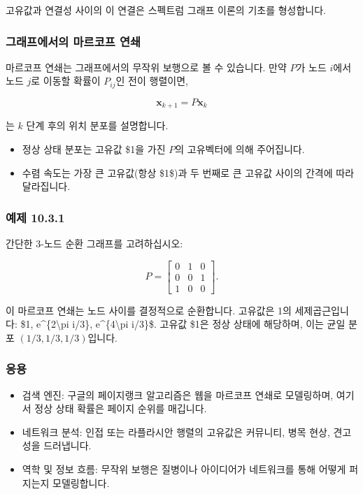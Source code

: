 \documentclass[
  12pt,
  a4paper,
]{article}
\begin{document}
고유값과 연결성 사이의 이 연결은 스펙트럼 그래프 이론의 기초를 형성합니다.

\subsubsection{그래프에서의 마르코프 연쇄}\label{markov-chains-on-graphs}

마르코프 연쇄는 그래프에서의 무작위 보행으로 볼 수 있습니다. 만약 \(P\)가 노드 \(i\)에서 노드 \(j\)로 이동할 확률이 \(P_{ij}\)인 전이 행렬이면,

\[\mathbf{x}_{k+1} = P \mathbf{x}_k\]

는 \(k\) 단계 후의 위치 분포를 설명합니다.

\begin{itemize}
\item
  정상 상태 분포는 고유값 \$1\)을 가진 \(P\)의 고유벡터에 의해 주어집니다.
\item
  수렴 속도는 가장 큰 고유값(항상 \$1\$)과 두 번째로 큰 고유값 사이의 간격에 따라 달라집니다.
\end{itemize}

\subsubsection{예제 10.3.1}\label{example-1031}

간단한 3-노드 순환 그래프를 고려하십시오:

\[P = \begin{bmatrix}
0 & 1 & 0 \\
0 & 0 & 1 \\
1 & 0 & 0
\end{bmatrix}.\]

이 마르코프 연쇄는 노드 사이를 결정적으로 순환합니다. 고유값은 1의 세제곱근입니다: \$1, e\^{}\{2\textbackslash pi i/3\}, e\^{}\{4\textbackslash pi i/3\}\$. 고유값 \$1\)은 정상 상태에 해당하며, 이는 균일 분포 \((1/3,1/3,1/3)\)입니다.

\subsubsection{응용}\label{applications-3}

\begin{itemize}
\item
  검색 엔진: 구글의 페이지랭크 알고리즘은 웹을 마르코프 연쇄로 모델링하며, 여기서 정상 상태 확률은 페이지 순위를 매깁니다.
\item
  네트워크 분석: 인접 또는 라플라시안 행렬의 고유값은 커뮤니티, 병목 현상, 견고성을 드러냅니다.
\item
  역학 및 정보 흐름: 무작위 보행은 질병이나 아이디어가 네트워크를 통해 어떻게 퍼지는지 모델링합니다.
\end{itemize}
\end{document}

